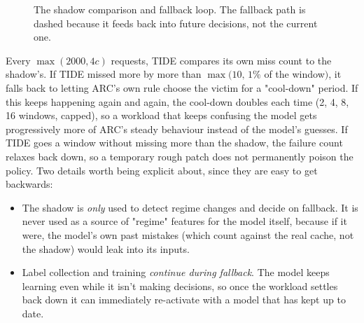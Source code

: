 \documentclass[10pt,a4paper]{article}
\begin{document}
\begin{figure}[H]
\centering
{}
\caption{The shadow comparison and fallback loop. The fallback path is dashed because it feeds back into
future decisions, not the current one.}
\end{figure}

Every $\max(2000, 4c)$ requests, TIDE compares its own miss count to the shadow's. If TIDE missed more by
more than $\max(10,\, 1\%$ of the window$)$, it falls back to letting ARC's own rule choose the victim
for a "cool-down" period. If this keeps happening again and again, the cool-down doubles each time
(2, 4, 8, 16 windows, capped), so a workload that keeps confusing the model gets progressively more of
ARC's steady behaviour instead of the model's guesses. If TIDE goes a window without missing more than the
shadow, the failure count relaxes back down, so a temporary rough patch does not permanently poison the
policy. Two details worth being explicit about, since they are easy to get backwards:
\begin{itemize}
  \item The shadow is \emph{only} used to detect regime changes and decide on fallback. It is never used
        as a source of "regime" features for the model itself, because if it were, the model's own past
        mistakes (which count against the real cache, not the shadow) would leak into its inputs.
  \item Label collection and training \emph{continue during fallback}. The model keeps learning even while
        it isn't making decisions, so once the workload settles back down it can immediately re-activate
        with a model that has kept up to date.
\end{itemize}
\end{document}
